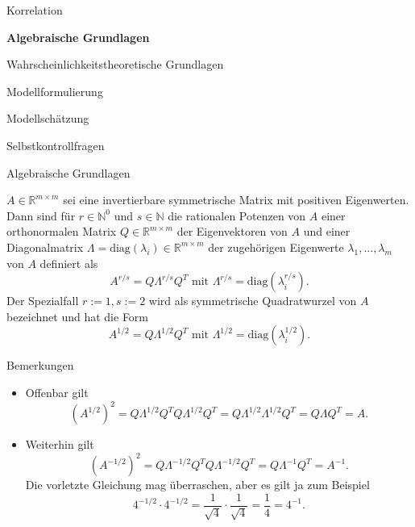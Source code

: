 \documentclass[
  8pt,
  ignorenonframetext,
]{beamer}
\providecommand{\tightlist}{%
  \setlength{\itemsep}{0pt}\setlength{\parskip}{0pt}}
\begin{document}
\begin{frame}{}
\protect\hypertarget{section-5}{}
\vfill
\large

Korrelation

\textbf{Algebraische Grundlagen}

Wahrscheinlichkeitstheoretische Grundlagen

Modellformulierung

Modellschätzung

Selbstkontrollfragen \vfill
\end{frame}

\begin{frame}{Algebraische Grundlagen}
\protect\hypertarget{algebraische-grundlagen}{}
\footnotesize
\begin{definition}
\justifying
$A \in \mathbb{R}^{m \times m}$ sei eine invertierbare symmetrische Matrix mit
positiven Eigenwerten. Dann sind für $r \in \mathbb{N}^0$ und $s \in \mathbb{N}$
die rationalen Potenzen von $A$ einer orthonormalen Matrix $Q \in \mathbb{R}^{m \times m}$
der Eigenvektoren von $A$ und einer Diagonalmatrix  $\Lambda = \mbox{diag}(\lambda_i) \in \mathbb{R}^{m \times m}$
der zugehörigen Eigenwerte $\lambda_1,...,\lambda_m$ von $A$ definiert als
\begin{equation}
A^{r/s} = Q \Lambda^{r/s} Q^T \mbox{ mit } \Lambda^{r/s} = \mbox{diag}\left(\lambda_i^{r/s}\right).
\end{equation}
Der Spezialfall $r:= 1, s := 2$ wird als symmetrische Quadratwurzel von $A$ bezeichnet
und hat die Form
\begin{equation}
A^{1/2} = Q\Lambda^{1/2}Q^T \mbox{ mit } \Lambda^{1/2} = \mbox{diag}\left(\lambda_i^{1/2}\right).
\end{equation}
\end{definition}

Bemerkungen

\begin{itemize}
\tightlist
\item
  Offenbar gilt \begin{equation}
  \left(A^{1/2} \right)^2 = Q\Lambda^{1/2}Q^TQ\Lambda^{1/2}Q^T = Q\Lambda^{1/2}\Lambda^{1/2}Q^T =  Q\Lambda Q^T = A.
  \end{equation}
\item
  Weiterhin gilt \begin{equation}
  \left(A^{-1/2} \right)^2 = Q\Lambda^{-1/2}Q^TQ\Lambda^{-1/2}Q^T = Q\Lambda^{-1}Q^T = A^{-1}.
  \end{equation} Die vorletzte Gleichung mag überraschen, aber es gilt
  ja zum Beispiel \begin{equation}
  4^{-1/2}\cdot 4^{-1/2} = \frac{1}{\sqrt{4}}\cdot\frac{1}{\sqrt{4}} = \frac{1}{4} = 4^{-1}.
  \end{equation}
\end{itemize}
\end{frame}
\end{document}
